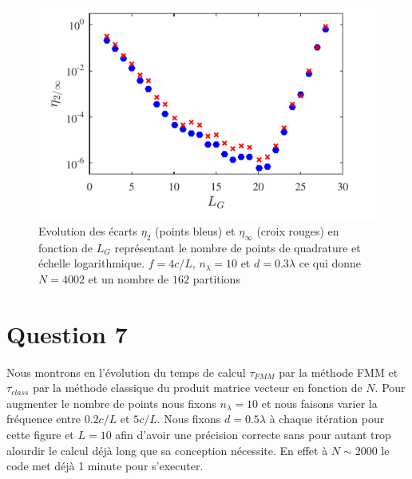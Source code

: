 \documentclass[10pt]{article}
\begin{document}
\begin{multicols}{2}
\begin{figure}[H]
  \begin{center}
  \includegraphics[width=0.95\columnwidth]{Q6b_2.pdf}
  \vspace*{-11pt}
  \caption{Evolution des écarts $\eta_2$ (points bleus) et $\eta_{\infty}$ (croix rouges) en fonction de $L_G$ représentant le nombre de points de quadrature et échelle logarithmique. $f=4c/L$, $n_\lambda =10$ et $d=0.3\lambda$ ce qui donne $N = 4002$ et un nombre de $162$ partitions}
  \label{fig:Q6b}
  \end{center}
\end{figure}
\vspace*{-22pt}




\vspace*{22pt}

\section*{Question 7}


Nous montrons en  l'évolution du temps de calcul $\tau_{FMM}$ par la méthode FMM et $\tau_{class}$ par la méthode classique du produit matrice vecteur en fonction de $N$. Pour augmenter le nombre de points nous fixons $n_\lambda = 10$ et nous faisons varier la fréquence entre $0.2c/L$ et $5c/L$. Nous fixons $d=0.5\lambda$ à chaque itération pour cette figure et $L=10$ afin d'avoir une précision correcte sans pour autant trop alourdir le calcul déjà long que sa conception nécessite. En effet à $N \sim 2000$ le code met déjà 1 minute pour s'executer.


\end{multicols}
\end{document}
